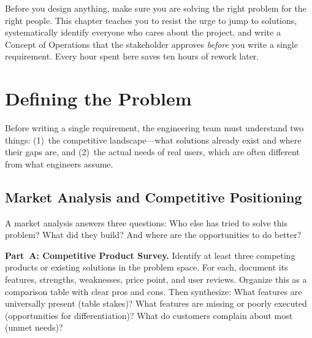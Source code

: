 \documentclass[11pt,letterpaper,twoside,openany]{book}
\begin{document}
\begin{keyconceptbox}
Before you design anything, make sure you are solving the right problem for the right people. This chapter teaches you to resist the urge to jump to solutions, systematically identify everyone who cares about the project, and write a Concept of Operations that the stakeholder approves \emph{before} you write a single requirement. Every hour spent here saves ten hours of rework later.
\end{keyconceptbox}

\vspace{1em}

\FloatBarrier
\section{Defining the Problem}

Before writing a single requirement, the engineering team must understand two things: (1)~the competitive landscape---what solutions already exist and where their gaps are, and (2)~the actual needs of real users, which are often different from what engineers assume.

\subsection{Market Analysis and Competitive Positioning}
A market analysis answers three questions: Who else has tried to solve this problem? What did they build? And where are the opportunities to do better?

\textbf{Part~A: Competitive Product Survey.} Identify at least three competing products or existing solutions in the problem space. For each, document its features, strengths, weaknesses, price point, and user reviews. Organize this as a comparison table with clear pros and cons. Then synthesize: What features are universally present (table stakes)? What features are missing or poorly executed (opportunities for differentiation)? What do customers complain about most (unmet needs)?
\end{document}
